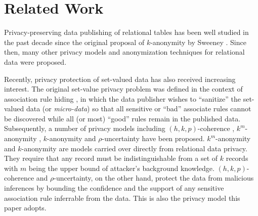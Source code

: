 \section{Related Work}


Privacy-preserving data publishing of relational tables has been well
studied in the past decade since the original proposal of $k$-anonymity by
Sweeney \etal \cite{Sweeney2002:k-anonymity}. 
Since then, many other privacy models and anonymization
techniques \cite{Kifer:l-diversity, Bayardo:optimal-k-anonymity,
Fung:2005:TopdownSpe, LeFevre:2005:Incognito, LeFevre:2006:Mondrian,
Wong:2010:NGP} for relational data were proposed.

Recently, privacy protection of set-valued data has also received 
increasing interest.
The original set-value privacy problem was defined in the context of
association rule hiding
\cite{atallah99:disclosure, tkde:VerykiosEBSD04:ARH, tkde:WuCC07:hiding},
in which the data publisher wishes to ``sanitize''
the set-valued data (or {\em micro-data}) so that all sensitive or ``bad''
associate rules cannot be discovered while all (or most)  ``good'' rules remain
in the published data.  
Subsequently, a number of privacy models 
including $(h,k,p)$-coherence \cite{Xu:2008:ATD},
$k^m$-anonymity \cite{Terrovitis:2008:PAS},
$k$-anonymity \cite{He:2009:ASD} and
$\rho$-uncertainty \cite{Cao:2010:rho} have been proposed.
$k^m$-anonymity and $k$-anonymity are models carried over directly from
relational data privacy. They require that any record must be
indistinguishable from a set of $k$ records 
with $m$ being the upper bound of attacker's background knowledge.
$(h,k,p)$-coherence and $\rho$-uncertainty, on the other hand, protect
the data from malicious inferences by bounding the confidence and
the support of any sensitive association rule inferrable from the data.
This is also the privacy model this paper adopts.

